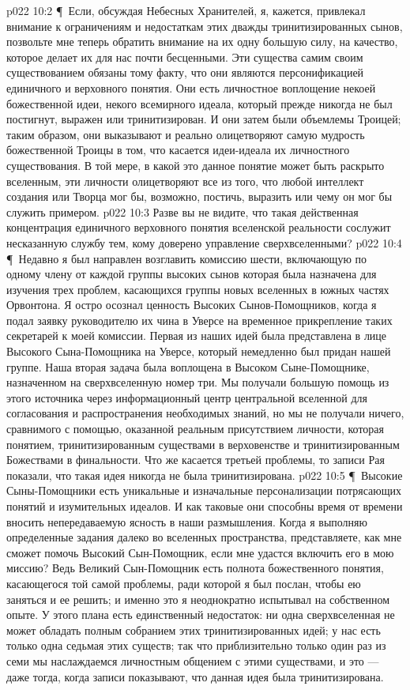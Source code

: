 \vs p022 10:2 \P\ Если, обсуждая Небесных Хранителей, я, кажется, привлекал внимание к ограничениям и недостаткам этих дважды тринитизированных сынов, позвольте мне теперь обратить внимание на их одну большую силу, на качество, которое делает их для нас почти бесценными. Эти существа самим своим существованием обязаны тому факту, что они являются персонификацией единичного и верховного понятия. Они есть личностное воплощение некоей божественной идеи, некого всемирного идеала, который прежде никогда не был постигнут, выражен или тринитизирован. И они затем были объемлемы Троицей; таким образом, они выказывают и реально олицетворяют самую мудрость божественной Троицы в том, что касается идеи\hyp{}идеала их личностного существования. В той мере, в какой это данное понятие может быть раскрыто вселенным, эти личности олицетворяют все из того, что любой интеллект создания или Творца мог бы, возможно, постичь, выразить или чему он мог бы служить примером. 
\vs p022 10:3 Разве вы не видите, что такая действенная концентрация единичного верховного понятия вселенской реальности сослужит несказанную службу тем, кому доверено управление сверхвселенными?
\vs p022 10:4 \P\ Недавно я был направлен возглавить комиссию шести, включающую по одному члену от каждой группы высоких сынов которая была назначена для изучения трех проблем, касающихся группы новых вселенных в южных частях Орвонтона. Я остро осознал ценность Высоких Сынов\hyp{}Помощников, когда я подал заявку руководителю их чина в Уверсе на временное прикрепление таких секретарей к моей комиссии. Первая из наших идей была представлена в лице Высокого Сына\hyp{}Помощника на Уверсе, который немедленно был придан нашей группе. Наша вторая задача была воплощена в Высоком Сыне\hyp{}Помощнике, назначенном на сверхвселенную номер три. Мы получали большую помощь из этого источника через информационный центр центральной вселенной для согласования и распространения необходимых знаний, но мы не получали ничего, сравнимого с помощью, оказанной реальным присутствием личности, которая  понятием, тринитизированным существами в верховенстве и тринитизированным Божествами в финальности. Что же касается третьей проблемы, то записи Рая показали, что такая идея никогда не была тринитизирована.
\vs p022 10:5 \P\ Высокие Сыны\hyp{}Помощники есть уникальные и изначальные персонализации потрясающих понятий и изумительных идеалов. И как таковые они способны время от времени вносить непередаваемую ясность в наши размышления. Когда я выполняю определенные задания далеко во вселенных пространства, представляете, как мне сможет помочь Высокий Сын\hyp{}Помощник, если мне удастся включить его в мою миссию? Ведь Великий Сын\hyp{}Помощник есть полнота божественного понятия, касающегося той самой проблемы, ради которой я был послан, чтобы ею заняться и ее решить; и именно это я неоднократно испытывал на собственном опыте. У этого плана есть единственный недостаток: ни одна сверхвселенная не может обладать полным собранием этих тринитизированных идей; у нас есть только одна седьмая этих существ; так что приблизительно только один раз из семи мы наслаждаемся личностным общением с этими существами, и это --- даже тогда, когда записи показывают, что данная идея была тринитизирована.
